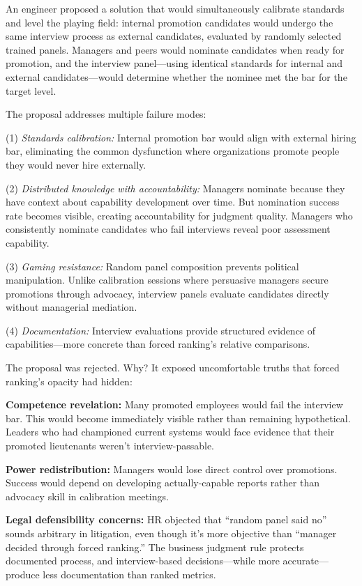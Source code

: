 \documentclass[12pt]{article}
\begin{document}
An engineer proposed a solution that would simultaneously calibrate standards and level the playing field: internal promotion candidates would undergo the same interview process as external candidates, evaluated by randomly selected trained panels. Managers and peers would nominate candidates when ready for promotion, and the interview panel---using identical standards for internal and external candidates---would determine whether the nominee met the bar for the target level.

The proposal addresses multiple failure modes:

(1) \emph{Standards calibration:} Internal promotion bar would align with external hiring bar, eliminating the common dysfunction where organizations promote people they would never hire externally.

(2) \emph{Distributed knowledge with accountability:} Managers nominate because they have context about capability development over time. But nomination success rate becomes visible, creating accountability for judgment quality. Managers who consistently nominate candidates who fail interviews reveal poor assessment capability.

(3) \emph{Gaming resistance:} Random panel composition prevents political manipulation. Unlike calibration sessions where persuasive managers secure promotions through advocacy, interview panels evaluate candidates directly without managerial mediation.

(4) \emph{Documentation:} Interview evaluations provide structured evidence of capabilities---more concrete than forced ranking's relative comparisons.

The proposal was rejected. Why? It exposed uncomfortable truths that forced ranking's opacity had hidden:

\textbf{Competence revelation:} Many promoted employees would fail the interview bar. This would become immediately visible rather than remaining hypothetical. Leaders who had championed current systems would face evidence that their promoted lieutenants weren't interview-passable.

\textbf{Power redistribution:} Managers would lose direct control over promotions. Success would depend on developing actually-capable reports rather than advocacy skill in calibration meetings.

\textbf{Legal defensibility concerns:} HR objected that ``random panel said no'' sounds arbitrary in litigation, even though it's more objective than ``manager decided through forced ranking.'' The business judgment rule protects documented process, and interview-based decisions---while more accurate---produce less documentation than ranked metrics.
\end{document}
